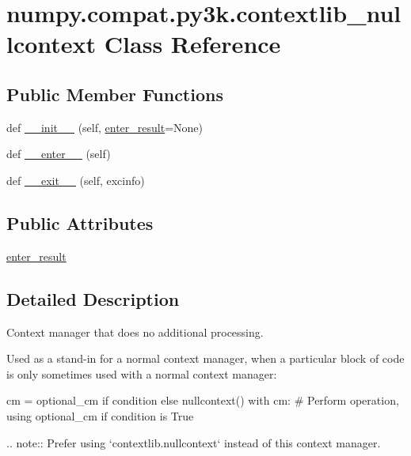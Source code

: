 \hypertarget{classnumpy_1_1compat_1_1py3k_1_1contextlib__nullcontext}{}\section{numpy.\+compat.\+py3k.\+contextlib\+\_\+nullcontext Class Reference}
\label{classnumpy_1_1compat_1_1py3k_1_1contextlib__nullcontext}
\subsection*{Public Member Functions}
\begin{DoxyCompactItemize}
\item 
def \hyperlink{classnumpy_1_1compat_1_1py3k_1_1contextlib__nullcontext_ab3cc50c9999e23c44c42b0dcc25fd737}{\+\_\+\+\_\+init\+\_\+\+\_\+} (self, \hyperlink{classnumpy_1_1compat_1_1py3k_1_1contextlib__nullcontext_aabeb16f755492cc7bae6d0901b2c23c3}{enter\+\_\+result}=None)
\item 
def \hyperlink{classnumpy_1_1compat_1_1py3k_1_1contextlib__nullcontext_a2f667afcd652459df12c55ad04a989e8}{\+\_\+\+\_\+enter\+\_\+\+\_\+} (self)
\item 
def \hyperlink{classnumpy_1_1compat_1_1py3k_1_1contextlib__nullcontext_a431cc3dbfd5023d351f9ee51c659fb89}{\+\_\+\+\_\+exit\+\_\+\+\_\+} (self, excinfo)
\end{DoxyCompactItemize}
\subsection*{Public Attributes}
\begin{DoxyCompactItemize}
\item 
\hyperlink{classnumpy_1_1compat_1_1py3k_1_1contextlib__nullcontext_aabeb16f755492cc7bae6d0901b2c23c3}{enter\+\_\+result}
\end{DoxyCompactItemize}


\subsection{Detailed Description}
\begin{DoxyVerb}Context manager that does no additional processing.

Used as a stand-in for a normal context manager, when a particular
block of code is only sometimes used with a normal context manager:

cm = optional_cm if condition else nullcontext()
with cm:
    # Perform operation, using optional_cm if condition is True

.. note::
    Prefer using `contextlib.nullcontext` instead of this context manager.
\end{DoxyVerb}
 

